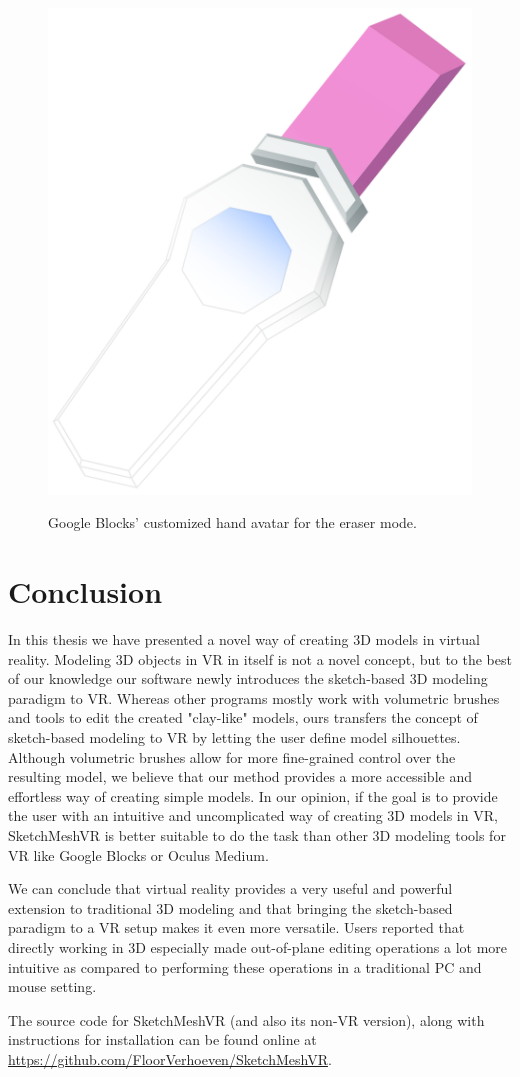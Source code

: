 \begin{figure}[!h]
    \centering
    \includegraphics[width=0.3\linewidth]{figures/blocks_tool}\\
    \caption[Google Blocks tool meshes]{Google Blocks' customized hand avatar for the eraser mode.
      \label{fig:blocks_tool}}
\end{figure}

\section{Conclusion}
In this thesis we have presented a novel way of creating 3D models in virtual reality. Modeling 3D objects in VR in itself is not a novel concept, but to the best of our knowledge our software newly introduces the sketch-based 3D modeling paradigm to VR. Whereas other programs mostly work with volumetric brushes and tools to edit the created "clay-like" models, ours transfers the concept of sketch-based modeling to VR by letting the user define model silhouettes. Although volumetric brushes allow for more fine-grained control over the resulting model, we believe that our method provides a more accessible and effortless way of creating simple models. In our opinion, if the goal is to provide the user with an intuitive and uncomplicated way of creating 3D models in VR, SketchMeshVR is better suitable to do the task than other 3D modeling tools for VR like Google Blocks or Oculus Medium. 

We can conclude that virtual reality provides a very useful and powerful extension to traditional 3D modeling and that bringing the sketch-based paradigm to a VR setup makes it even more versatile. Users reported that directly working in 3D especially made out-of-plane editing operations a lot more intuitive as compared to performing these operations in a traditional PC and mouse setting.

The source code for SketchMeshVR (and also its non-VR version), along with instructions for installation can be found online at \url{https://github.com/FloorVerhoeven/SketchMeshVR}. 